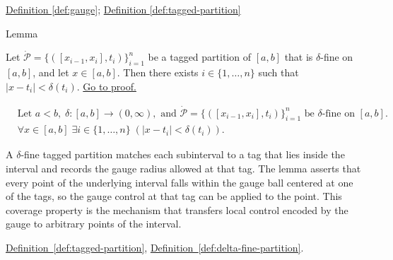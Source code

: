 \begin{remark*}[Dependencies]
\hyperref[def:gauge]{Definition \ref*{def:gauge}}; \hyperref[def:tagged-partition]{Definition \ref*{def:tagged-partition}}
\end{remark*}


\begin{lemmabox}{Lemma}
\begin{lemma}
\label{lem:every-point-covered-by-tag}
Let $\dot{\mathcal{P}}=\{([x_{i-1},x_i],t_i)\}_{i=1}^n$ be a tagged partition of $[a,b]$ that is $\delta$-fine on $[a,b]$, and let $x\in[a,b]$. Then there exists $i\in\{1,\ldots,n\}$ such that $|x-t_i|<\delta(t_i)$.
\hyperref[prf:every-point-covered-by-tag]{Go to proof.}
\end{lemma}
\end{lemmabox}

\begin{remark*}
\[
\begin{aligned}
&\text{Let } a<b,\; \delta:[a,b]\to(0,\infty), \text{ and } \dot{\mathcal{P}}=\{([x_{i-1},x_i],t_i)\}_{i=1}^n \text{ be }\delta\text{-fine on }[a,b].\\
&\forall x\in[a,b]\;\exists i\in\{1,\ldots,n\}\;(|x-t_i|<\delta(t_i)).
\end{aligned}
\]
\end{remark*}

\begin{remark*}[Interpretation]
A $\delta$-fine tagged partition matches each subinterval to a tag that lies inside the interval and records the gauge radius allowed at that tag. The lemma asserts that every point of the underlying interval falls within the gauge ball centered at one of the tags, so the gauge control at that tag can be applied to the point. This coverage property is the mechanism that transfers local control encoded by the gauge to arbitrary points of the interval.
\end{remark*}

\begin{remark*}[Dependencies]
\hyperref[def:tagged-partition]{Definition~\ref*{def:tagged-partition}},
\hyperref[def:delta-fine-partition]{Definition~\ref*{def:delta-fine-partition}}.
\end{remark*}

